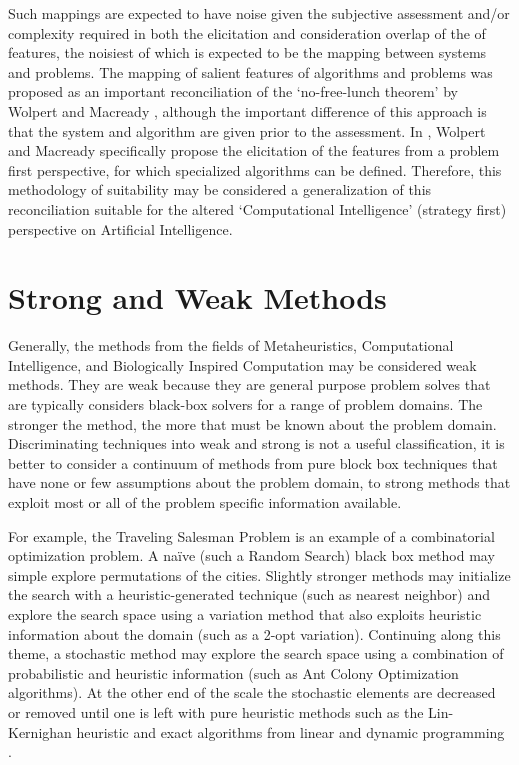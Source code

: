 \documentclass[a4paper, 11pt]{article}
\begin{document}
Such mappings are expected to have noise given the subjective assessment and/or complexity required in both the elicitation and consideration overlap of the of features, the noisiest of which is expected to be the mapping between systems and problems. 
The mapping of salient features of algorithms and problems was proposed as an important reconciliation of the `no-free-lunch theorem' by Wolpert and Macready \cite{Wolpert1997}, although the important difference of this approach is that the system and algorithm are given prior to the assessment. In \cite{Wolpert1995}, Wolpert and Macready specifically propose the elicitation of the features from a problem first perspective, for which specialized algorithms can be defined. Therefore, this methodology of suitability may be considered a generalization of this reconciliation suitable for the altered `Computational Intelligence' (strategy first) perspective on Artificial Intelligence.

%
%
\section{Strong and Weak Methods}
\label{sec:strong_methods}
Generally, the methods from the fields of Metaheuristics, Computational Intelligence, and Biologically Inspired Computation may be considered weak methods. They are weak because they are general purpose problem solves that are typically considers black-box solvers for a range of problem domains. The stronger the method, the more that must be known about the problem domain.
Discriminating techniques into weak and strong is not a useful classification, it is better to consider a continuum of methods from pure block box techniques that have none or few assumptions about the problem domain, to strong methods that exploit most or all of the problem specific information available.

For example, the Traveling Salesman Problem is an example of a combinatorial optimization problem. A na\"ive (such a Random Search) black box method may simple explore permutations of the cities. Slightly stronger methods may initialize the search with a heuristic-generated technique (such as nearest neighbor) and explore the search space using a variation method that also exploits heuristic information about the domain (such as a 2-opt variation). Continuing along this theme, a stochastic method may explore the search space using a combination of probabilistic and heuristic information (such as Ant Colony Optimization algorithms). At the other end of the scale the stochastic elements are decreased or removed until one is left with pure heuristic methods such as  the Lin-Kernighan heuristic \cite{Lin1973} and exact algorithms from linear and dynamic programming \cite{Woeginger2003}.
\end{document}
